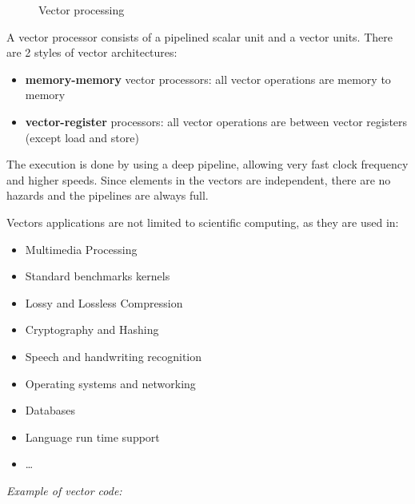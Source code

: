 \documentclass[english]{article}
\begin{document}
\begin{figure}[htbp]
  \bigskip
  \centering
  \caption{Vector processing}
  \label{fig:vector-processing}
  \bigskip
\end{figure}

A vector processor consists of a pipelined scalar unit and a vector units.
There are 2 styles of vector architectures:

\begin{itemize}
  \item \textbf{memory-memory} vector processors: all vector operations are memory to memory
  \item \textbf{vector-register} processors: all vector operations are between vector registers (except load and store)
\end{itemize}

The execution is done by using a deep pipeline, allowing very fast clock frequency and higher speeds.
Since elements in the vectors are independent, there are no hazards and the pipelines are always full.

Vectors applications are not limited to scientific computing, as they are used in:

\begin{itemize}
  \item Multimedia Processing
  \item Standard benchmarks kernels
  \item Lossy and Lossless Compression
  \item Cryptography and Hashing
  \item Speech and handwriting recognition
  \item Operating systems and networking
  \item Databases
  \item Language run time support
  \item \ldots
\end{itemize}

\bigskip
\textit{Example of vector code:}
\end{document}
